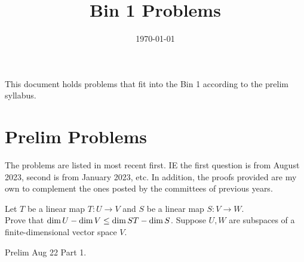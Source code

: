 \documentclass[answers]{exam}
\title{Bin 1 Problems}
\date{\today}
\author{}
\begin{document}
\maketitle
This document holds problems that fit into the Bin 1 according to the prelim syllabus. 

\tableofcontents

\section{Prelim Problems}
The problems are listed in most recent first. IE the first question is from August 2023, second is from January 2023, etc. In addition, the proofs provided are my own to complement the ones posted by the committees of previous years.
\begin{questions}
    \question Let $T$ be a linear map $T:U\rightarrow V$ and $S$ be a linear map $S:V\rightarrow W$.\\
    Prove that $\dim U-\dim V \leq \dim\null ST - \dim\null S$.
    \question Suppose $U,W$ are subspaces of a finite-dimensional vector space $V.$
    \question Prelim Aug 22 Part 1.
\end{questions}
\end{document}
